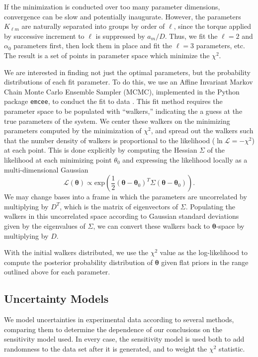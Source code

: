 \documentclass[linenumbers]{aastex631}
\newcommand{\parens}[1]{\left( #1 \right)}
\begin{document}
If the minimization is conducted over too many parameter dimensions, convergence can be slow and potentially inaugurate. However, the parameters $K_{\ell m}$ are naturally separated into groups by order of $\ell$, since the torque applied by successive increment to $\ell$ is suppressed by $a_m/D$. Thus, we fit the $\ell=2$ and $\alpha_0$ parameters first, then lock them in place and fit the $\ell=3$ parameters, etc. The result is a set of points in parameter space which minimize the $\chi^2$.

We are interested in finding not just the optimal parameters, but the probability distributions of each fit parameter. To do this, we use an Affine Invariant Markov Chain Monte Carlo Ensemble Sampler (MCMC), implemented in the Python package \texttt{emcee}, to conduct the fit to data \cite{ForemanMackey2013emceeTM}. This fit method requires the parameter space to be populated with ``walkers,'' indicating the a guess at the true parameters of the system. We center these walkers on the minimizing parameters computed by the minimization of $\chi^2$, and spread out the walkers such that the number density of walkers is proportional to the likelihood ($\ln \mathcal{L} = -\chi^2$) at each point. This is done explicitly by computing the Hessian $\Sigma$ of the likelihood at each minimizing point $\theta_0$ and expressing the likelihood locally as a multi-dimensional Gaussian
\begin{equation}
\mathcal{L}(\bm \theta) \propto \text{exp}\parens{\frac{1}{2}(\bm \theta-\bm \theta_0)^T \Sigma (\bm \theta-\bm \theta_0)}.
\end{equation}
We may change bases into a frame in which the parameters are uncorrelated by multiplying by $D^T$, which is the matrix of eigenvectors of $\Sigma$. Populating the walkers in this uncorrelated space according to Gaussian standard deviations given by the eigenvalues of $\Sigma$, we can convert these walkers back to $\bm \theta$-space by multiplying by $D$.

With the initial walkers distributed, we use the $\chi^2$ value as the log-likelihood to compute the posterior probability distribution of $\bm \theta$ given flat priors in the range outlined above for each parameter.


\subsection{Uncertainty Models}
\label{sec:uncertainty-models}
We model uncertainties in experimental data according to several methods, comparing them to determine the dependence of our conclusions on the sensitivity model used. In every case, the sensitivity model is used both to add randomness to the data set after it is generated, and to weight the $\chi^2$ statistic.
\end{document}
